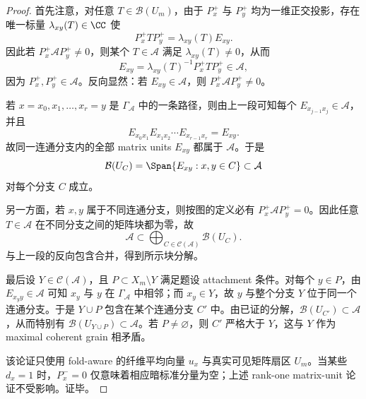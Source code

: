 \begin{proof}
首先注意，对任意 \(T\in\mathcal B(U_m)\)，由于 \(P_x^+\) 与 \(P_y^+\) 均为一维正交投影，存在唯一标量 \(\lambda_{xy}(T)\in\CC\) 使
\[
P_x^+TP_y^+=\lambda_{xy}(T)E_{xy}.
\]
因此若 \(P_x^+\mathcal A P_y^+\ne0\)，则某个 \(T\in\mathcal A\) 满足 \(\lambda_{xy}(T)\ne0\)，从而
\[
E_{xy}=\lambda_{xy}(T)^{-1}P_x^+TP_y^+\in\mathcal A,
\]
因为 \(P_x^+,P_y^+\in\mathcal A\)。反向显然：若 \(E_{xy}\in\mathcal A\)，则 \(P_x^+\mathcal A P_y^+\ne0\)。

若 \(x=x_0,x_1,\ldots,x_r=y\) 是 \(\Gamma_{\mathcal A}\) 中的一条路径，则由上一段可知每个 \(E_{x_{j-1}x_j}\in\mathcal A\)，并且
\[
E_{x_0x_1}E_{x_1x_2}\cdots E_{x_{r-1}x_r}=E_{xy}.
\]
故同一连通分支内的全部 matrix units \(E_{xy}\) 都属于 \(\mathcal A\)。于是
\[
\mathcal B(U_C)=\Span\{E_{xy}:x,y\in C\}\subset\mathcal A
\]
对每个分支 \(C\) 成立。

另一方面，若 \(x,y\) 属于不同连通分支，则按图的定义必有 \(P_x^+\mathcal A P_y^+=0\)。因此任意 \(T\in\mathcal A\) 在不同分支之间的矩阵块都为零，故
\[
\mathcal A\subset\bigoplus_{C\in\mathcal C(\mathcal A)}\mathcal B(U_C).
\]
与上一段的反向包含合并，得到所示块分解。

最后设 \(Y\in\mathcal C(\mathcal A)\)，且 \(P\subset X_m\setminus Y\) 满足题设 attachment 条件。对每个 \(y\in P\)，由 \(E_{x_y y}\in\mathcal A\) 可知 \(x_y\) 与 \(y\) 在 \(\Gamma_{\mathcal A}\) 中相邻；而 \(x_y\in Y\)，故 \(y\) 与整个分支 \(Y\) 位于同一个连通分支。于是 \(Y\cup P\) 包含在某个连通分支 \(C'\) 中。由已证的分解，\(\mathcal B(U_{C'})\subset\mathcal A\)，从而特别有 \(\mathcal B(U_{Y\cup P})\subset\mathcal A\)。若 \(P\ne\varnothing\)，则 \(C'\) 严格大于 \(Y\)，这与 \(Y\) 作为 maximal coherent grain 相矛盾。

该论证只使用 fold-aware 的纤维平均向量 \(u_x\) 与真实可见矩阵扇区 \(U_m\)。当某些 \(d_x=1\) 时，\(P_x^-=0\) 仅意味着相应暗标准分量为空；上述 rank-one matrix-unit 论证不受影响。证毕。
\end{proof}
